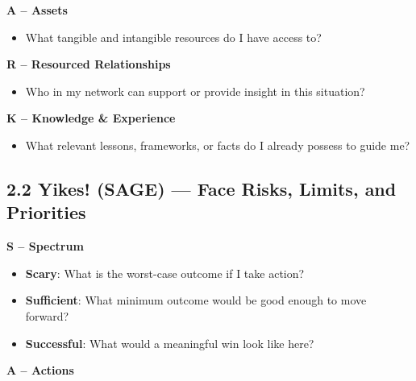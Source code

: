 \documentclass[11pt]{article}
\begin{document}
\textbf{A – Assets}

\begin{itemize}[noitemsep]
  \item What tangible and intangible resources do I have access to?
\end{itemize}
\begin{answerbox}
\vspace{3em}
\end{answerbox}

\textbf{R – Resourced Relationships}

\begin{itemize}[noitemsep]
  \item Who in my network can support or provide insight in this situation?
\end{itemize}
\begin{answerbox}
\vspace{3em}
\end{answerbox}

\textbf{K – Knowledge \& Experience}

\begin{itemize}[noitemsep]
  \item What relevant lessons, frameworks, or facts do I already possess to guide me?
\end{itemize}
\begin{answerbox}
\vspace{3em}
\end{answerbox}

\subsection*{2.2 Yikes! (SAGE) --- Face Risks, Limits, and Priorities}

\textbf{S – Spectrum}

\begin{itemize}[noitemsep]
  \item \textbf{Scary}: What is the worst-case outcome if I take action?
  \item \textbf{Sufficient}: What minimum outcome would be good enough to move forward?
  \item \textbf{Successful}: What would a meaningful win look like here?
\end{itemize}
\begin{answerbox}
\vspace{4em}
\end{answerbox}

\textbf{A – Actions}
\end{document}
